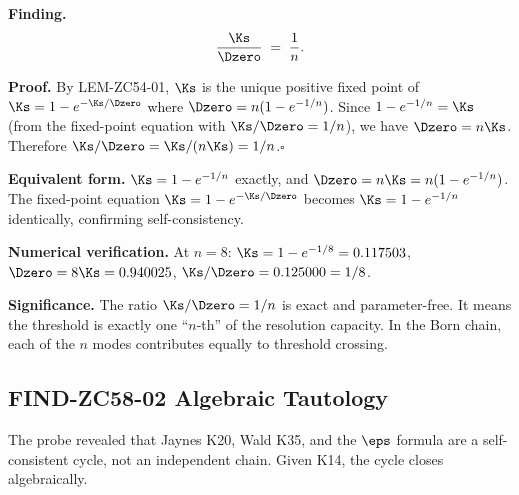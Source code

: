 \documentclass[12pt, a4paper]{article}
\begin{document}
\begin{derivedbox}[title={FIND-ZC58-01: $\Ks/\Dzero=1/n$
  --- Exact Algebraic Identity ($R_0$)}]
\textbf{Finding.}
\begin{equation}
  \frac{\Ks}{\Dzero} \;=\; \frac{1}{n}.
  \label{eq:ks-d0}
\end{equation}

\textbf{Proof.}
By LEM-ZC54-01, $\Ks$ is the unique positive fixed point of
$\Ks=1-e^{-\Ks/\Dzero}$ where $\Dzero=n(1-e^{-1/n})$.
Since $1-e^{-1/n}=\Ks$ (from the fixed-point equation with
$\Ks/\Dzero=1/n$), we have $\Dzero=n\Ks$.
Therefore $\Ks/\Dzero=\Ks/(n\Ks)=1/n$.\hfill$\square$

\textbf{Equivalent form.}
$\Ks = 1-e^{-1/n}$ exactly, and $\Dzero=n\Ks=n(1-e^{-1/n})$.
The fixed-point equation $\Ks=1-e^{-\Ks/\Dzero}$ becomes
$\Ks=1-e^{-1/n}$ identically, confirming self-consistency.

\textbf{Numerical verification.}
At $n=8$: $\Ks=1-e^{-1/8}=0.117503$, $\Dzero=8\Ks=0.940025$,
$\Ks/\Dzero=0.125000=1/8$. \checkmark

\textbf{Significance.}
The ratio $\Ks/\Dzero=1/n$ is exact and parameter-free.
It means the threshold is exactly one ``$n$-th'' of the
resolution capacity.  In the Born chain, each of the $n$
modes contributes equally to threshold crossing.
\end{derivedbox}

\subsection{FIND-ZC58-02 \quad Algebraic Tautology}
\label{sec:find02}

The probe revealed that Jaynes K20, Wald K35, and the $\eps$
formula are a self-consistent cycle, not an independent chain.
Given K14, the cycle closes algebraically.

\end{document}
